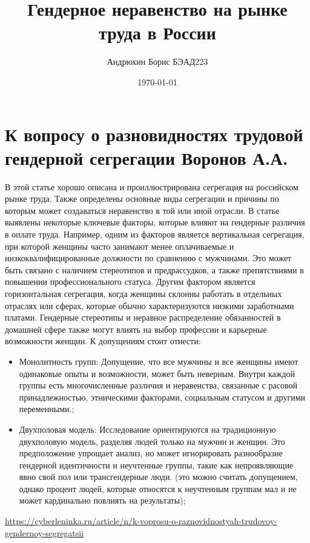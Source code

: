 \documentclass[a4paper,14pt]{article}
\author{Андрюхин Борис БЭАД223}
\title{Гендерное неравенство на рынке труда в России}
\date{\today}
\begin{document}
\maketitle

\section{К вопросу о разновидностях трудовой гендерной сегрегации Воронов А.А.}
В этой статье хорошо описана и проиллюстрирована сегрегация на российском рынке труда. Также определены основные виды сегрегации и причины по которым может создаваться неравенство в той или иной отрасли.
В статье выявлены некоторые ключевые факторы, которые влияют на гендерные различия в оплате труда.  Например, одним из факторов является вертикальная сегрегация, при которой женщины часто занимают менее оплачиваемые и низкоквалифицированные должности по сравнению с мужчинами. Это может быть связано с наличием стереотипов и предрассудков, а также препятствиями в повышении профессионального статуса.
Другим фактором является горизонтальная сегрегация, когда женщины склонны работать в отдельных отраслях или сферах, которые обычно характеризуются низкими заработными платами. Гендерные стереотипы и неравное распределение обязанностей в домашней сфере также могут влиять на выбор профессии и карьерные возможности женщин. 
К допущениям стоит отнести:

\begin{itemize}
    \item Монолитность групп: Допущение, что все мужчины и все женщины имеют одинаковые опыты и возможности, может быть неверным. Внутри каждой группы есть многочисленные различия и неравенства, связанные с расовой принадлежностью, этническими факторами, социальным статусом и другими переменными.;
    \item Двухполовая модель: Исследование ориентируются на традиционную двухполовую модель, разделяя людей только на мужчин и женщин. Это предположение упрощает анализ, но может игнорировать разнообразие гендерной идентичности и неучтенные группы, такие как непроявляющие явно свой пол или трансгендерные люди. (это можно считать допущением, однако процент людей, которые относятся к неучтенным группам мал и не может кардинально повлиять на результаты);
\end{itemize}

 \url{https://cyberleninka.ru/article/n/k-voprosu-o-raznovidnostyah-trudovoy-gendernoy-segregatsii}
\end{document}
